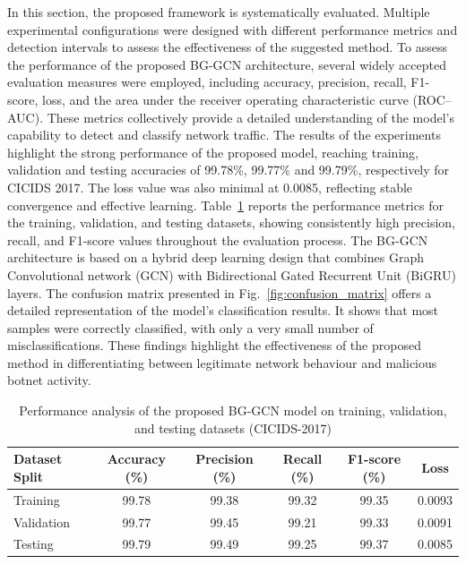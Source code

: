 \documentclass[a4paper,fleqn]{cas-sc}
\begin{document}
In this section, the proposed framework is systematically evaluated. Multiple experimental configurations were designed with different performance metrics and detection intervals to assess the effectiveness of the suggested method. 
To assess the performance of the proposed BG-GCN architecture, several widely accepted evaluation measures were employed, including accuracy, precision, recall, F1-score, loss, and the area under the receiver operating characteristic curve (ROC–AUC). These metrics collectively provide a detailed understanding of the model’s capability to detect and classify network traffic. The results of the experiments highlight the strong performance of the proposed model, reaching training, validation and testing accuracies of 99.78\%, 99.77\% and 99.79\%, respectively for CICIDS 2017. The loss value was also minimal at 0.0085, reflecting stable convergence and effective learning. Table~\ref{tab:performance} reports the performance metrics for the training, validation, and testing datasets, showing consistently high precision, recall, and F1-score values throughout the evaluation process.
The BG-GCN architecture is based on a hybrid deep learning design that combines Graph Convolutional network (GCN) with Bidirectional Gated Recurrent Unit (BiGRU) layers. The confusion matrix presented in Fig.~\ref{fig:confusion_matrix} offers a detailed representation of the model’s classification results. It shows that most samples were correctly classified, with only a very small number of misclassifications. These findings highlight the effectiveness of the proposed method in differentiating between legitimate network behaviour and malicious botnet activity.
\begin{table}[htbp]
\caption{Performance analysis of the proposed BG-GCN model on training, validation, and testing datasets (CICIDS-2017)}\label{tab:performance}
\centering
\begin{tabular}{@{}lccccc@{}}
\toprule
Dataset Split & Accuracy (\%) & Precision (\%) & Recall (\%) & F1-score (\%) & Loss \\
\midrule
Training & 99.78 & 99.38 & 99.32 & 99.35 & 0.0093 \\
Validation & 99.77 & 99.45 & 99.21 & 99.33 & 0.0091 \\
Testing & 99.79 & 99.49 & 99.25 & 99.37 & 0.0085 \\
\bottomrule
\end{tabular}
\end{table}
\end{document}
